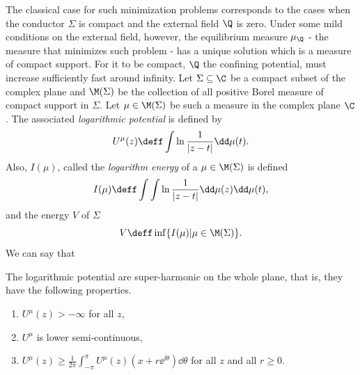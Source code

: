 The classical case for such minimization problems corresponds to the cases when the conductor $\Sigma$ is compact and the external field $\Q$ is zero. Under some mild conditions on the external field, however, the equilibrium measure $\mu_\Q$ - the measure that minimizes such problem - has a unique solution which is a measure of compact support. For it to be compact, $\Q$ the confining potential, must increase sufficiently fast around infinity. Let $\Sigma \subseteq \C$ be a compact subset of the complex plane and $\M(\Sigma)$ be the collection of all positive Borel measure of compact support in $\Sigma$. Let $\mu \in \M(\Sigma)$ be such a measure in the complex plane $\C$. The associated \textit{logarithmic potential} is defined by 
\begin{equation}
	U^{\mu}(z) \deff \int \ln \frac{1}{|z - t|} \dd \mu(t).
\end{equation}
Also, $I(\mu)$, called the \textit{logarithm energy} of a $\mu \in \M(\Sigma)$ is defined
\begin{equation}
	I(\mu) \deff \int \int \ln \frac{1}{|z-t|} \dd \mu(z) \dd \mu (t),
\end{equation}
and the energy $V$ of $\Sigma$
\begin{equation}
	V \deff \inf\{ I(\mu) | \mu \in \M(\Sigma)\}.
\end{equation}
We can say that
\begin{proposicao} \cite{saff2024logarithmic}
	The logarithmic potential are super-harmonic on the whole plane, that is, they have the following properties.
	\begin{enumerate}
		\item $U^{\mu}(z) > -\infty$ for all $z$,
		\item $U^{\mu}$ is lower semi-continuous,
		\item $U^{\mu}(z) \geq \frac{1}{2\pi} \int_{-\pi}^{\pi} U^{\mu}(z)(x + r \ee^{\ii \theta}) \dd \theta$ for all $z$ and all $r \geq 0$. 
	\end{enumerate}
\end{proposicao}
